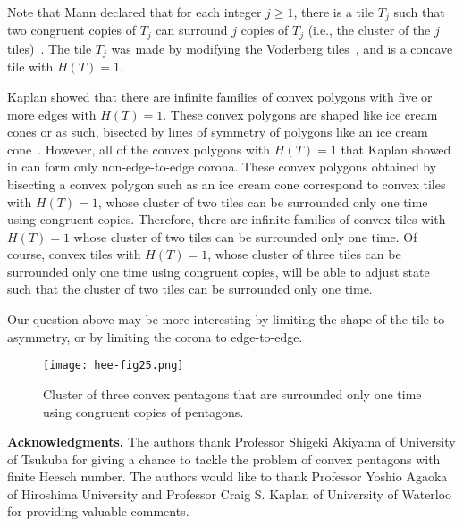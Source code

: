 \documentclass[11pt, a4paper]{article}
\begin{document}
\noindent
Note that Mann declared that for each integer $j \ge 1$, there is a tile 
$T_{j}$ such that two congruent copies of $T_{j}$ can surround $j$ copies of 
$T_{j}$ (i.e., the cluster of the $j$ tiles)~\cite{Mann_2002}. The tile $T_{j}$ was 
made by modifying the Voderberg tiles~\cite{Brass_2005, G_and_S_1987}, and 
is a concave tile with $H(T) = 1$.


Kaplan showed that there are infinite families of convex polygons with five 
or more edges with $H(T) = 1$. These convex polygons are shaped like ice 
cream cones or as such, bisected by lines of symmetry of polygons like an 
ice cream cone~\cite{Kaplan_2017_p3}. However, all of the convex polygons 
with $H(T) = 1$ that Kaplan showed in \cite{Kaplan_2017_p3} can form 
only non-edge-to-edge corona. These convex polygons obtained by 
bisecting a convex polygon such as an ice cream cone correspond to 
convex tiles with $H(T) = 1$, whose cluster of two tiles can be 
surrounded only one time using congruent copies. Therefore, there are 
infinite families of convex tiles with $H(T) = 1$ whose cluster of two tiles 
can be surrounded only one time. Of course, convex tiles with $H(T) = 1$, 
whose cluster of three tiles can be surrounded only one time using congruent 
copies, will be able to adjust state such that the cluster of two tiles can 
be surrounded only one time.

Our question above may be more interesting by limiting the shape of the tile 
to asymmetry, or by limiting the corona to edge-to-edge.



\renewcommand{\figurename}{{\small Figure.}}
\begin{figure}[htbp]
 \centering\texttt{[image: hee-fig25.png]} 
  \caption{{\small 
Cluster of three convex pentagons that are surrounded only one 
time using congruent copies of pentagons.
} 
\label{fig25}
}
\end{figure}









\bigskip




\bigskip
\noindent
\textbf{Acknowledgments.} 
The authors thank Professor Shigeki Akiyama of University of Tsukuba for 
giving a chance to tackle the problem of convex pentagons with finite Heesch 
number. The authors would like to thank Professor Yoshio Agaoka of Hiroshima 
University and Professor Craig S. Kaplan of University of Waterloo for 
providing valuable comments.
\end{document}
